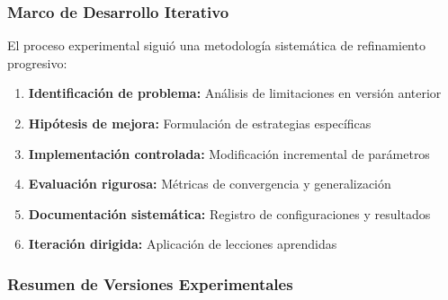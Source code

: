\subsubsection{Marco de Desarrollo Iterativo}

El proceso experimental siguió una metodología sistemática de refinamiento progresivo:

\begin{enumerate}
    \item \textbf{Identificación de problema:} Análisis de limitaciones en versión anterior
    \item \textbf{Hipótesis de mejora:} Formulación de estrategias específicas
    \item \textbf{Implementación controlada:} Modificación incremental de parámetros
    \item \textbf{Evaluación rigurosa:} Métricas de convergencia y generalización
    \item \textbf{Documentación sistemática:} Registro de configuraciones y resultados
    \item \textbf{Iteración dirigida:} Aplicación de lecciones aprendidas
\end{enumerate}

\newpage

\subsubsection{Resumen de Versiones Experimentales}

